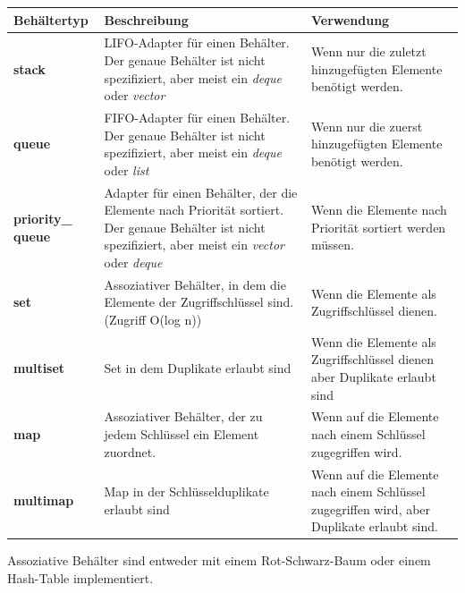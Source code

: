 \documentclass[12pt]{scrartcl}
\begin{document}
\begin{table}[H]
	\centering
	\begin{tabular}{ p{2.5cm} | p{7cm} | p{5cm} }
		Behältertyp               & Beschreibung
		                          & Verwendung                                                                \\
		\hline
		\textbf{stack}            & LIFO-Adapter für einen Behälter. Der genaue Behälter ist
		nicht spezifiziert, aber meist ein \emph{deque} oder \emph{vector}
		                          & Wenn nur die zuletzt hinzugefügten Elemente benötigt werden.              \\
		\hline
		\textbf{queue}            & FIFO-Adapter für einen Behälter. Der genaue Behälter ist
		nicht spezifiziert, aber meist ein \emph{deque} oder \emph{list}
		                          & Wenn nur die zuerst hinzugefügten Elemente benötigt werden.               \\
		\hline
		\textbf{priority\_ queue} & Adapter für einen Behälter, der die Elemente nach Priorität
		sortiert. Der genaue Behälter ist nicht spezifiziert, aber meist ein \emph{vector} oder
		\emph{deque}              & Wenn die Elemente nach Priorität sortiert werden müssen.                  \\
		\hline
		\textbf{set}              & Assoziativer Behälter, in dem die Elemente der Zugriffschlüssel
		sind.(Zugriff O(log n))
		                          & Wenn die Elemente als Zugriffschlüssel dienen.                            \\
		\hline
		\textbf{multiset}         & Set in dem Duplikate erlaubt sind
		                          & Wenn die Elemente als Zugriffschlüssel dienen aber Duplikate erlaubt sind \\
		\hline
		\textbf{map}              & Assoziativer Behälter, der zu jedem Schlüssel ein Element zuordnet.
		                          & Wenn auf die Elemente nach einem Schlüssel zugegriffen wird.              \\
		\hline
		\textbf{multimap}         & Map in der Schlüsselduplikate erlaubt sind
		                          & Wenn auf die Elemente nach einem Schlüssel zugegriffen wird,
		aber Duplikate erlaubt sind.                                                                          \\
	\end{tabular}
\end{table}

Assoziative Behälter sind entweder mit einem Rot-Schwarz-Baum oder einem Hash-Table implementiert.
\end{document}

